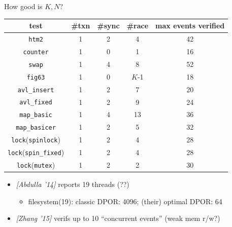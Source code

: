 \documentclass[xcolor=dvipsnames]{beamer}
\begin{document}
\begin{frame}{How good is $K,N$?}
	\begin{center}
		\small
		\begin{tabular}{c||c|c|c||c}
			{\bf test} & {\bf \#txn} & {\bf \#sync} & {\bf \#race} & {\bf max events verified} \\
			\hline
			{\tt htm2}	      & 1     & 2     & 4     & 42    \\ %
			{\tt counter}	   & 1     & 0     & 1     & 16    \\ %
			{\tt swap}	      & 1     & 4     & 8     & 52    \\ %
			{\tt fig63}	     & 1     & 0     & $K$-1 & 18    \\ %
			{\tt avl\_insert}       & 1     & 2     & 7     & 20    \\ %
			{\tt avl\_fixed}	& 1     & 2     & 9     & 24    \\ %
			{\tt map\_basic}	& 1     & 4     & 13    & 36    \\ %
			{\tt map\_basicer}      & 1     & 2     & 5     & 32    \\ %

			{\tt lock}({\tt spinlock})      & 1     & 2     & 4     & 28    \\ %
			{\tt lock}({\tt spin\_fixed})   & 1     & 2     & 4     & 28    \\ %
			{\tt lock}({\tt mutex})	 & 1     & 2     & 2     & 30    \\ %
		\end{tabular}
	\end{center}
	\linegap

	\begin{itemize}
		\item {\em [Abdulla '14]} reports 19 threads (??)
			\begin{itemize}
				\item {\sf filesystem(19)}: classic DPOR: 4096; (their) optimal DPOR: 64
			\end{itemize}
		\item {\em [Zhang '15]} verifs up to 10 ``concurrent events'' (weak mem r/w?)
	\end{itemize}
\end{frame}
\end{document}
